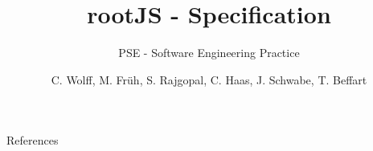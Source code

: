 \documentclass[18pt]{beamer}
\title[rootJS]{rootJS - Specification}
\subtitle{PSE - Software Engineering Practice}
\author{C. Wolff, M. Fr\"uh, S. Rajgopal, C. Haas, J. Schwabe, T. Beffart}
\institute{Steinbuch Center for Computing}
\begin{document}

\begin{frame}
\titlepage
\end{frame}












\appendix
\beginbackup

\begin{frame}[allowframebreaks]{References}
\printbibliography
\end{frame}

\backupend
\end{document}
